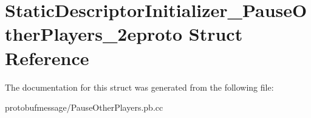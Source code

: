 \hypertarget{struct_static_descriptor_initializer___pause_other_players__2eproto}{\section{Static\-Descriptor\-Initializer\-\_\-\-Pause\-Other\-Players\-\_\-2eproto Struct Reference}
\label{struct_static_descriptor_initializer___pause_other_players__2eproto}
}


The documentation for this struct was generated from the following file\-:\begin{DoxyCompactItemize}
\item 
protobufmessage/Pause\-Other\-Players.\-pb.\-cc\end{DoxyCompactItemize}
